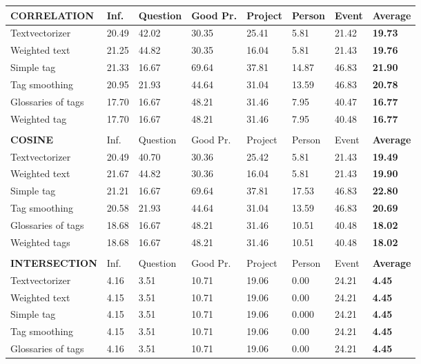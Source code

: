 \begin{table}
\begin{tabular}{| l | l | l | l | l | l | l | l |}
\hline
{\bf CORRELATION} & Inf. &  Question &  Good Pr.& Project & Person &  Event & {\bf Average} \\
\hline
Textvectorizer & 20.49 & 42.02 & 30.35 & 25.41 & 5.81 & 21.42 & {\bf 19.73} \\ 
Weighted text & 21.25 & 44.82 & 30.35 & 16.04 & 5.81 & 21.43 & {\bf 19.76} \\ 
Simple tag & 21.33 & 16.67 & 69.64 & 37.81 & 14.87 & 46.83 & {\bf 21.90} \\ 
Tag smoothing & 20.95 & 21.93 & 44.64 & 31.04 & 13.59 & 46.83 & {\bf 20.78} \\ 
Glossaries of tags & 17.70 & 16.67 & 48.21 & 31.46 & 7.95 & 40.47 & {\bf 16.77} \\ 
Weighted tag & 17.70 & 16.67 & 48.21 & 31.46 & 7.95 & 40.48 & {\bf 16.77} \\ 
\hline
\\
\hline
{\bf COSINE} & Inf. &  Question &  Good Pr.& Project & Person &  Event & {\bf Average} \\
\hline
Textvectorizer & 20.49 & 40.70 & 30.36 & 25.42 & 5.81 & 21.43 & {\bf 19.49} \\ 
Weighted text & 21.67 & 44.82 & 30.36 & 16.04 & 5.81 & 21.43 & {\bf 19.90} \\ 
Simple tag & 21.21 & 16.67 & 69.64 & 37.81 & 17.53 & 46.83 & {\bf 22.80 } \\ 
Tag smoothing & 20.58 & 21.93 & 44.64 & 31.04 & 13.59 & 46.83 & {\bf 20.69} \\ 
Glossaries of tags & 18.68 & 16.67 & 48.21 & 31.46 & 10.51 & 40.48 & {\bf 18.02} \\ 
Weighted tags & 18.68 & 16.67 & 48.21 & 31.46 & 10.51 & 40.48 & {\bf 18.02} \\ 
\hline
\\
\hline
{\bf INTERSECTION} & Inf. &  Question &  Good Pr.& Project & Person &  Event & {\bf Average} \\
\hline
Textvectorizer & 4.16 & 3.51 & 10.71 & 19.06 & 0.00 & 24.21 & {\bf 4.45} \\ 
Weighted text & 4.15 & 3.51 & 10.71 & 19.06 & 0.00 & 24.21 & {\bf 4.45} \\ 
Simple tag & 4.15 & 3.51 & 10.71 & 19.06 & 0.000 & 24.21 & {\bf 4.45} \\ 
Tag smoothing & 4.15 & 3.51 & 10.71 & 19.06 & 0.00 & 24.21 & {\bf 4.45} \\ 
Glossaries of tags & 4.16 & 3.51 & 10.71 & 19.06 & 0.00 & 24.21 & {\bf 4.45} \\ 

\end{tabular}
\end{table}
